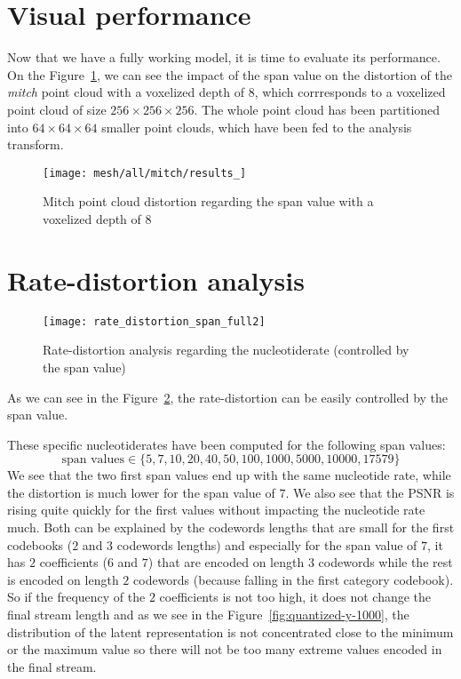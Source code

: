 
\label{sec:performance}


\section{Visual performance}

Now that we have a fully working model, it is time to evaluate its performance. On the Figure~\ref{fig:mitch-all}, we can see the impact of the span value on the distortion of the \textit{mitch} point cloud with a voxelized depth of $8$, which corrresponds to a voxelized point cloud of size $256 \times 256 \times 256$. 
The whole point cloud has been partitioned into $64 \times 64 \times 64$ smaller point clouds, which have been fed to the analysis transform.

\begin{figure}
    \centering
    \texttt{[image: mesh/all/mitch/results\_]}
    \caption{Mitch point cloud distortion regarding the span value with a voxelized depth of $8$}
    \label{fig:mitch-all}
\end{figure}

\section{Rate-distortion analysis}

\begin{figure}
    \centering
    \texttt{[image: rate\_distortion\_span\_full2]}
    \caption{Rate-distortion analysis regarding the nucleotiderate (controlled by the span value)}
    \label{fig:rate-distortion}
\end{figure}

As we can see in the Figure~\ref{fig:rate-distortion}, the rate-distortion can be easily controlled by the span value. 

These specific nucleotiderates have been computed for the following span values: $$\text{span values} \in \{5, 7, 10, 20, 40, 50, 100, 1000, 5000, 10000, 17579\}$$
We see that the two first span values end up with the same nucleotide rate, while the distortion is much lower for the span value of $7$. We also see that the PSNR is rising quite quickly for the first values without impacting the nucleotide rate much. Both can be explained by the codewords lengths that are small for the first codebooks ($2$ and $3$ codewords lengths) and especially for the span value of $7$, it has $2$ coefficients ($6$ and $7$) that are encoded on length $3$ codewords while the rest is encoded on length $2$ codewords (because falling in the first category codebook). So if the frequency of the $2$ coefficients is not too high, it does not change the final stream length and as we see in the Figure~\ref{fig:quantized-y-1000}, the distribution of the latent representation is not concentrated close to the minimum or the maximum value so there will not be too many extreme values encoded in the final stream.

